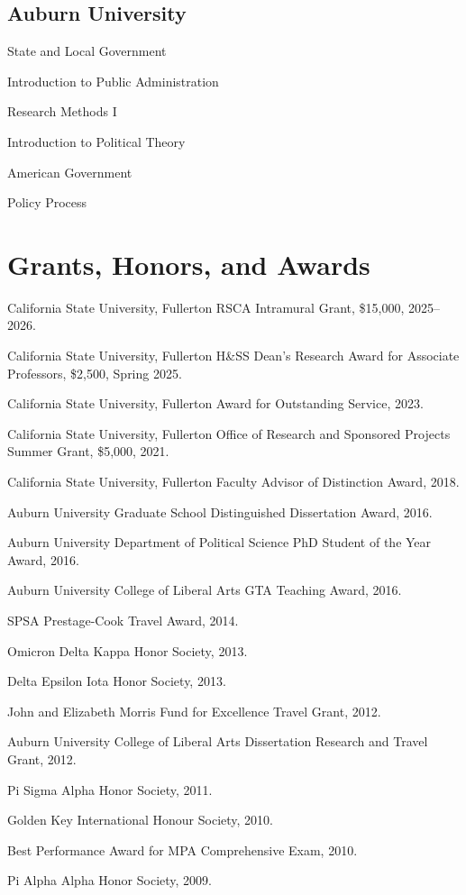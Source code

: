 \documentclass[12pt,letterpaper]{article}
\renewenvironment{itemize}{
  \begin{list}{}{
    \setlength{\leftmargin}{1.5em}
    \setlength{\itemsep}{0.25em}
    \setlength{\parskip}{0pt}
    \setlength{\parsep}{0.25em}
  }
}{
  \end{list}
}
\begin{document}
\subsection*{Auburn University}
\begin{itemize}\leftmargin=2pt\itemindent=-15pt
  \item State and Local Government
  \item Introduction to Public Administration
  \item Research Methods I
  \item Introduction to Political Theory
  \item American Government
  \item Policy Process
\end{itemize}

\section*{Grants, Honors, and Awards}
\begin{itemize}\leftmargin=2pt\itemindent=-15pt
  \item California State University, Fullerton RSCA Intramural Grant, \$15,000, 2025--2026.
  \item California State University, Fullerton H\&SS Dean's Research Award for Associate Professors, \$2,500, Spring 2025.
  \item California State University, Fullerton Award for Outstanding Service, 2023.
  \item California State University, Fullerton Office of Research and Sponsored Projects Summer Grant, \$5,000, 2021.
  \item California State University, Fullerton Faculty Advisor of Distinction Award, 2018.
  \item Auburn University Graduate School Distinguished Dissertation Award, 2016.
  \item Auburn University Department of Political Science PhD Student of the Year Award, 2016.
  \item Auburn University College of Liberal Arts GTA Teaching Award, 2016.
  \item SPSA Prestage-Cook Travel Award, 2014.
  \item Omicron Delta Kappa Honor Society, 2013.
  \item Delta Epsilon Iota Honor Society, 2013.
  \item John and Elizabeth Morris Fund for Excellence Travel Grant, 2012.
  \item Auburn University College of Liberal Arts Dissertation Research and Travel Grant, 2012.
  \item Pi Sigma Alpha Honor Society, 2011.
  \item Golden Key International Honour Society, 2010.
  \item Best Performance Award for MPA Comprehensive Exam, 2010.
  \item Pi Alpha Alpha Honor Society, 2009.
\end{itemize}
\end{document}
